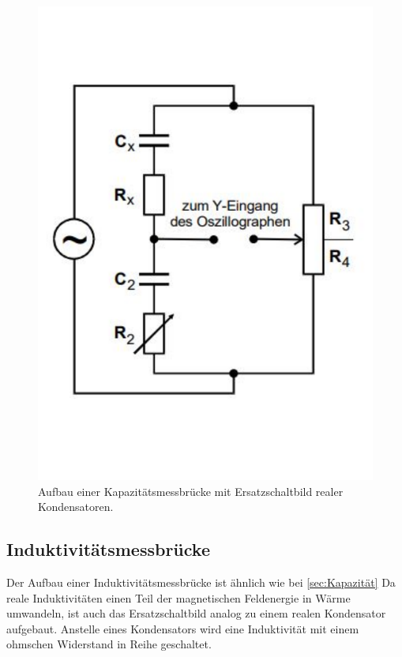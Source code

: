 \begin{figure}
    \centering
    \includegraphics[width=\textwidth]{KapBruecke.pdf}
    \caption{Aufbau einer Kapazitätsmessbrücke mit Ersatzschaltbild realer Kondensatoren.\cite{anleitung}}
\end{figure}

\subsection{Induktivitätsmessbrücke}
\label{sec:Induktivität}

Der Aufbau einer Induktivitätsmessbrücke ist ähnlich wie bei \ref{sec:Kapazität} 
Da reale Induktivitäten einen Teil der magnetischen Feldenergie in Wärme umwandeln, ist auch das Ersatzschaltbild analog zu einem realen Kondensator aufgebaut.
Anstelle eines Kondensators wird eine Induktivität mit einem ohmschen Widerstand in Reihe geschaltet.

